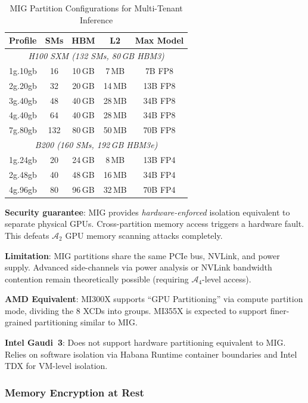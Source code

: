 \documentclass[conference,10pt]{IEEEtran}
\begin{document}
\begin{table}[!htbp]
\caption{MIG Partition Configurations for Multi-Tenant Inference}
\label{tab:mig}
\centering\footnotesize
\begin{tabular}{@{}lcccc@{}}
\toprule
\textbf{Profile} & \textbf{SMs} & \textbf{HBM} & \textbf{L2} & \textbf{Max Model} \\
\midrule
\multicolumn{5}{c}{\textit{H100 SXM (132 SMs, 80\,GB HBM3)}} \\
\midrule
1g.10gb & 16 & 10\,GB & 7\,MB & 7B FP8 \\
2g.20gb & 32 & 20\,GB & 14\,MB & 13B FP8 \\
3g.40gb & 48 & 40\,GB & 28\,MB & 34B FP8 \\
4g.40gb & 64 & 40\,GB & 28\,MB & 34B FP8 \\
7g.80gb & 132 & 80\,GB & 50\,MB & 70B FP8 \\
\midrule
\multicolumn{5}{c}{\textit{B200 (160 SMs, 192\,GB HBM3e)}} \\
\midrule
1g.24gb & 20 & 24\,GB & 8\,MB & 13B FP4 \\
2g.48gb & 40 & 48\,GB & 16\,MB & 34B FP4 \\
4g.96gb & 80 & 96\,GB & 32\,MB & 70B FP4 \\
\bottomrule
\end{tabular}
\end{table}

\textbf{Security guarantee}: MIG provides \emph{hardware-enforced} isolation equivalent to separate physical GPUs. Cross-partition memory access triggers a hardware fault. This defeats $\mathcal{A}_2$ GPU memory scanning attacks completely.

\textbf{Limitation}: MIG partitions share the same PCIe bus, NVLink, and power supply. Advanced side-channels via power analysis or NVLink bandwidth contention remain theoretically possible (requiring $\mathcal{A}_4$-level access).

\textbf{AMD Equivalent}: MI300X supports ``GPU Partitioning'' via compute partition mode, dividing the 8 XCDs into groups. MI355X is expected to support finer-grained partitioning similar to MIG.

\textbf{Intel Gaudi~3}: Does not support hardware partitioning equivalent to MIG. Relies on software isolation via Habana Runtime container boundaries and Intel TDX for VM-level isolation.

\subsubsection{Memory Encryption at Rest}
\end{document}
